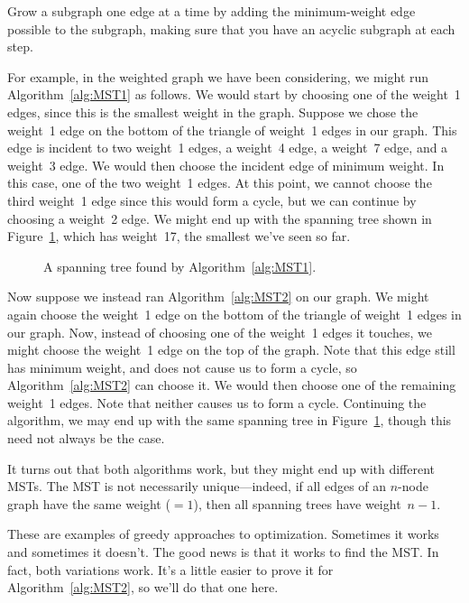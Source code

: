\begin{algorithm}\label{alg:MST2}
Grow a subgraph one edge at a time by adding the minimum-weight edge
possible to the subgraph, making sure that you have an acyclic
subgraph at each step.
\end{algorithm}

For example, in the weighted graph we have been considering, we might
run Algorithm~\ref{alg:MST1} as follows.  We would start by choosing
one of the weight~1 edges, since this is the smallest weight in the
graph.  Suppose we chose the weight~1 edge on the bottom of the
triangle of weight~1 edges in our graph.  This edge is incident to two
weight~1 edges, a weight~4 edge, a weight~7 edge, and a weight~3
edge.  We would then choose the incident edge of minimum weight.  In
this case, one of the two weight~1 edges.  At this point, we cannot
choose the third weight~1 edge since this would form a cycle, but we
can continue by choosing a weight~2 edge.  We might end up with the
spanning tree shown in Figure~\ref{fig:5KC}, which has weight~17, the
smallest we've seen so far.

\begin{figure}


\caption{A spanning tree found by Algorithm~\ref{alg:MST1}.}

\label{fig:5KC}

\end{figure}

Now suppose we instead ran Algorithm~\ref{alg:MST2} on our graph.  We
might again choose the weight~1 edge on the bottom of the triangle of
weight~1 edges in our graph.  Now, instead of choosing one of the
weight~1 edges it touches, we might choose the weight~1 edge on the
top of the graph.  Note that this edge still has minimum weight, and
does not cause us to form a cycle, so Algorithm~\ref{alg:MST2} can
choose it.  We would then choose one of the remaining weight~1 edges.
Note that neither causes us to form a cycle.  Continuing the
algorithm, we may end up with the same spanning tree in
Figure~\ref{fig:5KC}, though this need not always be the case.

It turns out that both algorithms work, but they might end up with
different MSTs.  The MST is not necessarily unique---indeed, if all
edges of an $n$-node graph have the same weight (${}=1$), then all
spanning trees have weight~$n - 1$.

These are examples of greedy approaches to optimization.  Sometimes it
works and sometimes it doesn't.  The good news is that it works to
find the MST\@.  In fact, both variations work.  It's a little easier
to prove it for Algorithm~\ref{alg:MST2}, so we'll do that one here.

